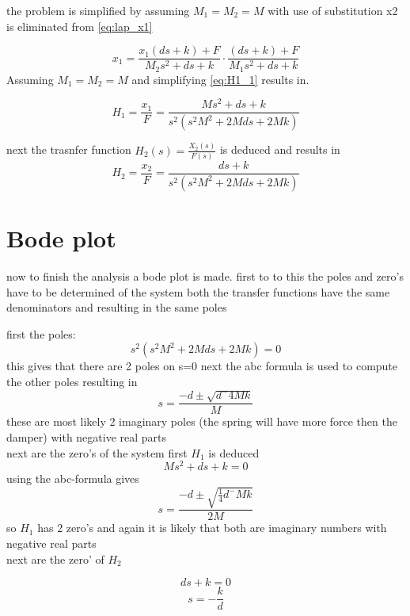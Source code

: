 \documentclass[report.tex]{subfiles}
\begin{document}
the problem is simplified by assuming $M_1=M_2=M$ with use of substitution x2 is eliminated from \eqref{eq:lap_x1}

\begin{equation}
\label{eq:H1_1}
x_1=\frac{x_1(ds+k)+F}{M_2s^2+ds+k}\cdot\frac{(ds+k)+F}{M_1s^2+ds+k}
\end{equation}
Assuming $M_1=M_2=M$ and simplifying \eqref{eq:H1_1} results in.

\begin{equation}
\label{eq:H1_2}
H_1=\frac{x_1}{F}=\frac{Ms^2+ds+k}{s^2(s^2M^2+2Mds+2Mk)}
\end{equation}

next the trasnfer function ${ H }_{ 2 }(s)=\frac { { X }_{ 2 }(s) }{ F(s) } $ is deduced and results in
\begin{equation}
\label{eq:H2}
H_2=\frac{x_2}{F}=\frac{ds+k}{s^2(s^2M^2+2Mds+2Mk)}
\end{equation}
\section{Bode plot}
now to finish the analysis a bode plot is made.
first to to this the poles and zero's have to be determined of the system
both the transfer functions have the same denominators and resulting in the same poles

first the poles:
\begin{equation}
s^2(s^2M^2+2Mds+2Mk)=0
\end{equation}
this gives that there are 2 poles on s=0
next the abc formula is used to compute the other poles resulting in
\begin{equation}
s=\frac{-d\pm\sqrt{d^-4Mk}}{M}
\end{equation}
these are most likely 2 imaginary poles (the spring will have more force then the damper) with negative real parts\\
next are the zero's of the system first $H_1$ is deduced
\begin{equation}
Ms^2+ds+k=0
\end{equation}
using the abc-formula gives
\begin{equation}
s=\frac{-d\pm\sqrt{\frac{1}{4}d^-Mk}}{2M}
\end{equation}
so $H_1$ has 2 zero's and again it is likely that both are imaginary numbers with negative real parts\\
next are the zero' of $H_2$

\begin{equation}
ds+k=0
\end{equation}
\begin{equation}
s=-\frac{k}{d}
\end{equation}
\end{document}
